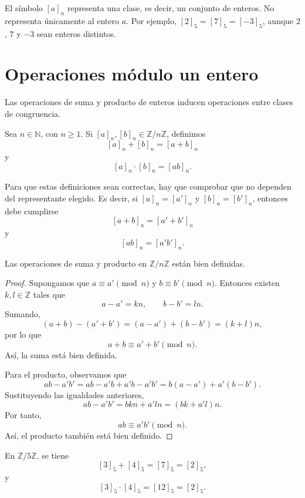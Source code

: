 \begin{advertencia}
El símbolo \([a]_n\) representa una clase, es decir, un conjunto de enteros. No representa únicamente al entero \(a\). Por ejemplo, \({[2]}_5=[7]_5=[-3]_5\), aunque \(2\), \(7\) y \(-3\) sean enteros distintos.
\end{advertencia}

\section{Operaciones módulo un entero}

Las operaciones de suma y producto de enteros inducen operaciones entre clases de congruencia.

\begin{definicion}
Sea \(n\in\mathbb{N}\), con \(n\geq 1\). Si \([a]_n,[b]_n\in\mathbb{Z}/n\mathbb{Z}\), definimos
\[
  [a]_n+[b]_n=[a+b]_n
\]
y
\[
  [a]_n\cdot[b]_n=[ab]_n.
\]
\end{definicion}

Para que estas definiciones sean correctas, hay que comprobar que no dependen del representante elegido. Es decir, si \([a]_n=[a']_n\) y \([b]_n=[b']_n\), entonces debe cumplirse
\[
  [a+b]_n=[a'+b']_n
\]
y
\[
  [ab]_n=[a'b']_n.
\]

\begin{proposicion}
Las operaciones de suma y producto en \(\mathbb{Z}/n\mathbb{Z}\) están bien definidas.
\end{proposicion}

\begin{proof}
Supongamos que \(a\equiv a'\pmod n\) y \(b\equiv b'\pmod n\). Entonces existen \(k,l\in\mathbb{Z}\) tales que
\[
  a-a'=kn, \qquad b-b'=ln.
\]
Sumando,
\[
  (a+b)-(a'+b')=(a-a')+(b-b')=(k+l)n,
\]
por lo que
\[
  a+b\equiv a'+b'\pmod n.
\]
Así, la suma está bien definida.

Para el producto, observamos que
\[
  ab-a'b'=ab-a'b+a'b-a'b'=b(a-a')+a'(b-b').
\]
Sustituyendo las igualdades anteriores,
\[
  ab-a'b'=bkn+a'ln=(bk+a'l)n.
\]
Por tanto,
\[
  ab\equiv a'b'\pmod n.
\]
Así, el producto también está bien definido.
\end{proof}

\begin{ejemplo}
En \(\mathbb{Z}/5\mathbb{Z}\), se tiene
\[
  [3]_5+[4]_5=[7]_5={[2]}_5,
\]
y
\[
  [3]_5\cdot[4]_5=[12]_5={[2]}_5.
\]
\end{ejemplo}

